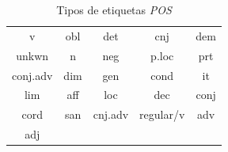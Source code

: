 \documentclass[letterpaper,12pt,oneside]{scrbook}
\theoremstyle{definition}
\begin{document}
	
	\begin{table}

		\centering

		\begin{tabular}{| c | c | c | c | c |}

			\hline

			v & obl & det & cnj & dem \\ 

			unkwn & n & neg & p.loc & prt \\

			conj.adv & dim & gen & cond & it \\

			lim & aff & loc & dec & conj  \\

			cord & san & cnj.adv & regular/v & adv \\

			adj & & & & \\

			\hline

		\end{tabular}

		\caption{Tipos de etiquetas \textit{POS}} 

		\label{table:pos_types}

	\end{table}

	
\end{document}
